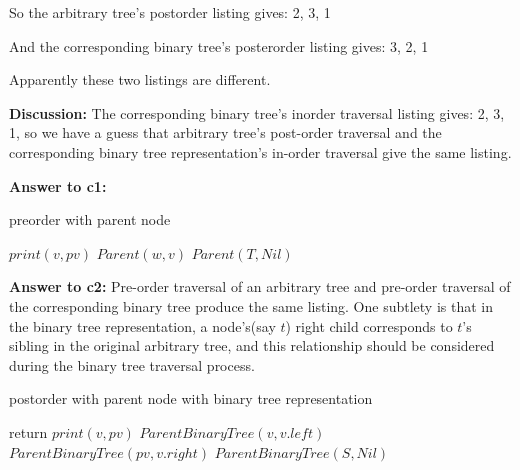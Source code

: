 \documentclass[a4paper,11pt]{article}
\theoremstyle{mytheor}
\begin{document}
So the arbitrary tree's postorder listing gives: 2, 3, 1

And the corresponding binary tree's posterorder listing gives: 3, 2, 1

Apparently these two listings are different.

\noindent\textbf{Discussion:} The corresponding binary tree's inorder traversal listing gives: 2, 3, 1, so we have a guess that arbitrary tree's post-order traversal and the corresponding binary tree representation's in-order traversal give the same listing.

\vspace{1.2in}

\noindent\textbf{Answer to c1:} 

\begin{algorithm}[H]
\caption{preorder with parent node}\label{sec:TREEEVALUATION_2_19_C1}
\begin{algorithmic}[1]
  \State $print(v, pv)$
    \State $Parent(w, v)$
  \EndFor
\EndProcedure
\State
{}
  \State $Parent(T, Nil)$
\EndProcedure
\end{algorithmic}
\end{algorithm}

\vspace{1.2in}

\noindent\textbf{Answer to c2:} Pre-order traversal of an arbitrary tree and pre-order traversal of the corresponding binary tree produce the same listing. One subtlety is that in the binary tree representation, a node's(say $t$) right child corresponds to $t$'s sibling in the original arbitrary tree, and this relationship should be considered during the binary tree traversal process.

\begin{algorithm}[H]
\caption{postorder with parent node with binary tree representation}\label{sec:TREEEVALUATION_2_19_C2}
\begin{algorithmic}[1]
    \State return
  \Else
    \State $print(v, pv)$
    \State $ParentBinaryTree(v, v.left)$ 
    \State $ParentBinaryTree(pv, v.right)$ 
  \EndIf
\EndProcedure
\State
{}
  \State $ParentBinaryTree(S, Nil)$
\EndProcedure
\end{algorithmic}
\end{algorithm}
\end{document}
